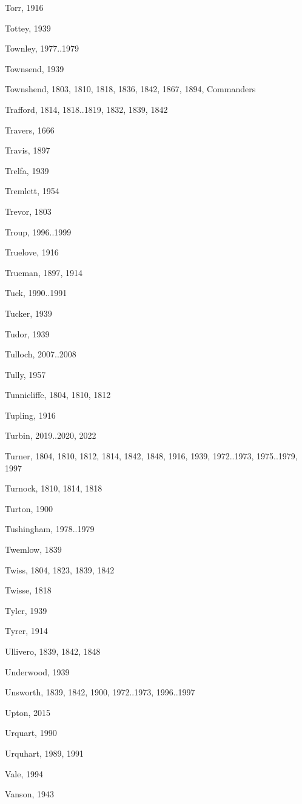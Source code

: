 \begin{theindex}
\item Torr, 1916
\item Tottey, 1939
\item Townley, 1977..1979
\item Townsend, 1939
\item Townshend, 1803, 1810, 1818, 1836, 1842, 1867, 1894, Commanders
\item Trafford, 1814, 1818..1819, 1832, 1839, 1842
\item Travers, 1666
\item Travis, 1897
\item Trelfa, 1939
\item Tremlett, 1954
\item Trevor, 1803
\item Troup, 1996..1999
\item Truelove, 1916
\item Trueman, 1897, 1914
\item Tuck, 1990..1991
\item Tucker, 1939
\item Tudor, 1939
\item Tulloch, 2007..2008
\item Tully, 1957
\item Tunnicliffe, 1804, 1810, 1812
\item Tupling, 1916
\item Turbin, 2019..2020, 2022
\item Turner, 1804, 1810, 1812, 1814, 1842, 1848, 1916, 1939, 1972..1973, 1975..1979, 1997
\item Turnock, 1810, 1814, 1818
\item Turton, 1900
\item Tushingham, 1978..1979
\item Twemlow, 1839
\item Twiss, 1804, 1823, 1839, 1842
\item Twisse, 1818
\item Tyler, 1939
\item Tyrer, 1914
\item Ullivero, 1839, 1842, 1848
\item Underwood, 1939
\item Unsworth, 1839, 1842, 1900, 1972..1973, 1996..1997
\item Upton, 2015
\item Urquart, 1990
\item Urquhart, 1989, 1991
\item Vale, 1994
\item Vanson, 1943

\end{theindex}
